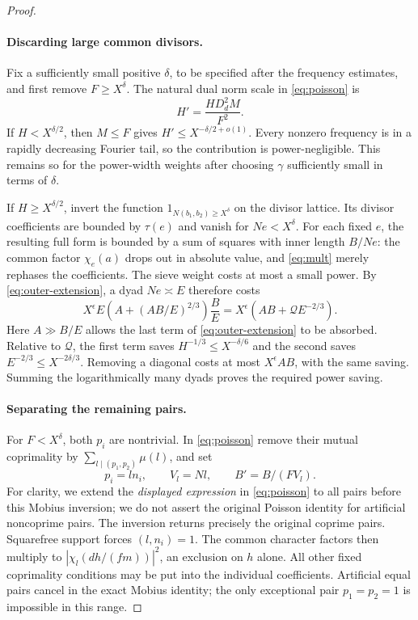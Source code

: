 \begin{proof}
\paragraph{Discarding large common divisors.}
Fix a sufficiently small positive $\delta$, to be specified after the
frequency estimates, and first remove $F\ge X^\delta$. The natural
dual norm scale in \eqref{eq:poisson} is
\begin{equation}
 H'=\frac{HD_d^2M}{F^2}.
 \label{eq:dispersion-dual-scale}
\end{equation}
If $H<X^{\delta/2}$, then $M\le F$ gives
$H'\le X^{-\delta/2+o(1)}$. Every nonzero frequency is in a rapidly
decreasing Fourier tail, so the contribution is power-negligible. This
remains so for the power-width weights after choosing $\gamma$
sufficiently small in terms of $\delta$.

If $H\ge X^{\delta/2}$, invert the function
$1_{N(b_1,b_2)\ge X^\delta}$ on the divisor lattice. Its divisor
coefficients are bounded by $\tau(e)$ and vanish for $Ne<X^\delta$.
For each fixed $e$, the resulting full form is bounded by a sum of
squares with inner length $B/Ne$: the common factor
$\chi_e(a)$ drops out in absolute value, and \eqref{eq:mult} merely
rephases the coefficients. The sieve weight costs at most a small power.
By \eqref{eq:outer-extension}, a dyad $Ne\asymp E$ therefore costs
\[
 X^\epsilon E\left(A+(AB/E)^{2/3}\right)\frac BE
 =X^\epsilon\left(AB+\mathcal Q E^{-2/3}\right).
\]
Here $A\gg B/E$ allows the last term of
\eqref{eq:outer-extension} to be absorbed. Relative to $\mathcal Q$,
the first term saves $H^{-1/3}\le X^{-\delta/6}$ and the second saves
$E^{-2/3}\le X^{-2\delta/3}$. Removing a diagonal costs at most
$X^\epsilon AB$, with the same saving. Summing the logarithmically many
dyads proves the required power saving.

\paragraph{Separating the remaining pairs.}
For $F<X^\delta$, both $p_i$ are nontrivial. In
\eqref{eq:poisson} remove their mutual coprimality by
$\sum_{l\mid(p_1,p_2)}\mu(l)$, and set
\[
 p_i=ln_i,\qquad V_l=Nl,\qquad B'=B/(FV_l).
\]
For clarity, we extend the \emph{displayed expression} in
\eqref{eq:poisson} to all pairs before this Mobius inversion; we do not
assert the original Poisson identity for artificial noncoprime pairs.
The inversion returns precisely the original coprime pairs. Squarefree
support forces $(l,n_i)=1$. The common character factors then multiply
to $|\chi_l(dh/(fm))|^2$, an exclusion on $h$ alone. All other fixed
coprimality conditions may be put into the individual coefficients.
Artificial equal pairs cancel in the exact Mobius identity; the only
exceptional pair $p_1=p_2=1$ is impossible in this range.


\end{proof}
